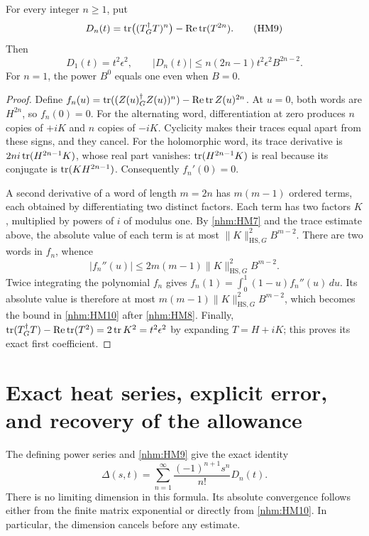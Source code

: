 \documentclass[11pt]{article}
\begin{document}
\begin{nhmlemma}
For every integer \(n\ge1\), put
\begin{equation}
 D_n(t)=\operatorname{tr}\bigl((T^\dagger_G T)^n\bigr)-\operatorname{Re}\operatorname{tr}(T^{2n}).
 \tag{HM9}\label{nhm:HM9}
\end{equation}
Then
\begin{equation}
 D_1(t)=t^2\epsilon^2,\qquad
 |D_n(t)|\le n(2n-1)t^2\epsilon^2 B^{2n-2}.
 \tag{HM10}\label{nhm:HM10}
\end{equation}
For \(n=1\), the power \(B^0\) equals one even when \(B=0\).
\end{nhmlemma}
\begin{proof}
Define
\(f_n(u)=\operatorname{tr}((Z(u)^\dagger_G Z(u))^n)-\operatorname{Re}\operatorname{tr} Z(u)^{2n}\).
At \(u=0\), both words are \(H^{2n}\), so \(f_n(0)=0\).
For the alternating word, differentiation at zero produces \(n\) copies
of \(+iK\) and \(n\) copies of \(-iK\). Cyclicity makes their traces equal
apart from these signs, and they cancel. For the holomorphic word, its trace
derivative is \(2ni\operatorname{tr}(H^{2n-1}K)\), whose real part vanishes:
\(\operatorname{tr}(H^{2n-1}K)\) is real because its conjugate is
\(\operatorname{tr}(KH^{2n-1})\). Consequently \(f_n'(0)=0\).

A second derivative of a word of length \(m=2n\) has \(m(m-1)\) ordered
terms, each obtained by differentiating two distinct factors. Each term
has two factors \(K\), multiplied by powers of \(i\) of modulus one.
By \eqref{nhm:HM7} and the trace estimate above, the absolute value of each
term is at most \(\|K\|_{\mathrm{HS},G}^2B^{m-2}\).
There are two words in \(f_n\), whence
\[
 |f_n''(u)|\le2m(m-1)\|K\|_{\mathrm{HS},G}^2B^{m-2}.
\]
Twice integrating the polynomial \(f_n\) gives
\(f_n(1)=\int_0^1(1-u)f_n''(u)\,du\).
Its absolute value is therefore at most
\(m(m-1)\|K\|_{\mathrm{HS},G}^2B^{m-2}\), which becomes the bound
in \eqref{nhm:HM10} after \eqref{nhm:HM8}.
Finally,
\(\operatorname{tr}(T^\dagger_G T)-\operatorname{Re}\operatorname{tr}(T^2)=2\operatorname{tr} K^2=t^2\epsilon^2\)
by expanding \(T=H+iK\); this proves its exact first coefficient.
\end{proof}

\section{Exact heat series, explicit error, and recovery of the allowance}

The defining power series and \eqref{nhm:HM9} give the exact identity
\begin{equation}
 \Delta(s,t)=\sum_{n=1}^{\infty}
       \frac{(-1)^{n+1}s^n}{n!}D_n(t).
 \tag{HM11}\label{nhm:HM11}
\end{equation}
There is no limiting dimension in this formula. Its absolute convergence
follows either from the finite matrix exponential or directly from
\eqref{nhm:HM10}. In particular, the dimension cancels before any estimate.
\end{document}
